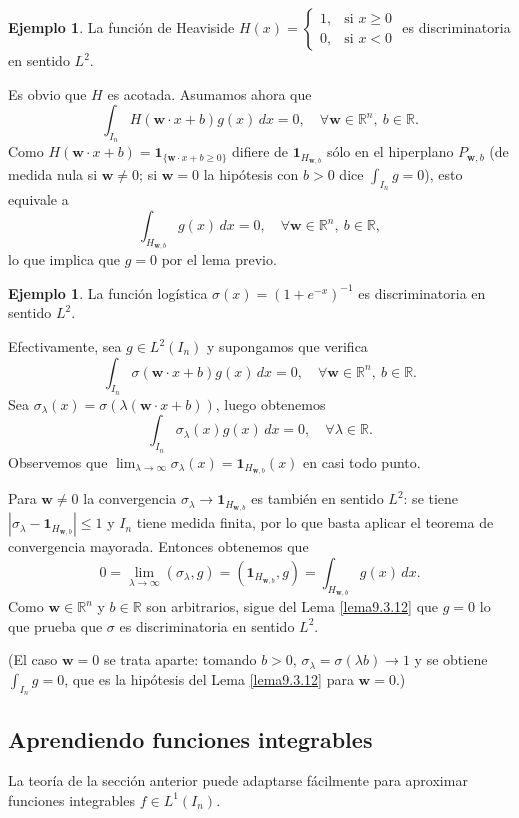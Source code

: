 \documentclass[12pt, a4paper]{amsbook}
\newcommand{\R}{{\mathbb R}}
\newcommand{\ww}{{\mathbf w}}
\newcommand{\I}{{\mathbf 1}}
\theoremstyle{remark}
\theoremstyle{definition}
\newtheorem{ejem}[teo]{Ejemplo}
\numberwithin{section}{chapter}
\numberwithin{subsection}{section}
\numberwithin{equation}{section}
\numberwithin{figure}{chapter}
\begin{document}
\begin{ejem}
La función de Heaviside $H(x) = \begin{cases} 1,& \text{si } x\ge 0\\ 0,& \text{si } x<0\end{cases}$ es discriminatoria en sentido $L^2$.
\end{ejem}

Es obvio que $H$ es acotada. Asumamos ahora que
$$
\int_{I_n} H(\ww\cdot x + b) g(x)\, dx = 0,\quad \forall \ww\in\R^n,\ b\in\R.
$$
Como $H(\ww\cdot x+b)=\I_{\{\ww\cdot x+b\ge0\}}$ difiere de $\I_{H_{\ww,b}}$ sólo en el hiperplano $P_{\ww,b}$ (de medida nula si $\ww\neq0$; si $\ww=0$ la hipótesis con $b>0$ dice $\int_{I_n}g=0$), esto equivale a
$$
\int_{H_{\ww, b}} g(x)\, dx =0,\quad \forall \ww\in\R^n,\ b\in\R,
$$
lo que implica que $g=0$ por el lema previo.

\begin{ejem}
La función logística $\sigma(x) = (1+e^{-x})^{-1}$ es discriminatoria en sentido $L^2$.
\end{ejem}

Efectivamente, sea $g\in L^2(I_n)$ y supongamos que verifica
$$
\int_{I_n} \sigma(\ww\cdot x + b) g(x)\, dx=0,\quad \forall \ww\in\R^n,\ b\in\R.
$$
Sea $\sigma_\lambda(x) = \sigma(\lambda(\ww\cdot x + b))$, luego obtenemos
$$
\int_{I_n} \sigma_\lambda(x) g(x)\, dx=0,\quad \forall \lambda\in\R.
$$
Observemos que $\lim_{\lambda\to\infty}\sigma_\lambda(x) = \I_{H_{\ww,b}}(x)$ en casi todo punto.

Para $\ww\ne0$ la convergencia $\sigma_\lambda\to \I_{H_{\ww,b}}$ es también en sentido $L^2$: se tiene $|\sigma_\lambda-\I_{H_{\ww,b}}|\le1$ y $I_n$ tiene medida finita, por lo que basta aplicar el teorema de convergencia mayorada. Entonces obtenemos que
$$
0=\lim_{\lambda\to\infty} (\sigma_\lambda, g) = (\I_{H_{\ww,b}}, g) = \int_{H_{\ww,b}} g(x)\, dx.
$$
Como $\ww\in\R^n$ y $b\in\R$ son arbitrarios, sigue del Lema \ref{lema9.3.12} que $g=0$ lo que prueba que $\sigma$ es discriminatoria en sentido $L^2$.

(El caso $\ww=0$ se trata aparte: tomando $b>0$, $\sigma_\lambda=\sigma(\lambda b)\to1$ y se obtiene $\int_{I_n}g=0$, que es la hipótesis del Lema \ref{lema9.3.12} para $\ww=0$.)

\subsection{Aprendiendo funciones integrables}

La teoría de la sección anterior puede adaptarse fácilmente para aproximar funciones integrables $f\in L^1(I_n)$.
\end{document}
